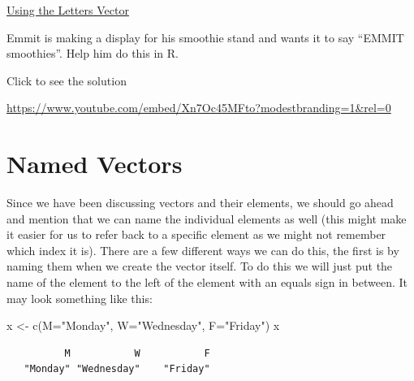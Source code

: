 \documentclass[
  letterpaper,
  DIV=11,
  numbers=noendperiod]{scrreprt}
\newenvironment{Shaded}{\begin{snugshade}}{\end{snugshade}}
\newcommand{\AttributeTok}[1]{\textcolor[rgb]{0.40,0.45,0.13}{#1}}
\newcommand{\FunctionTok}[1]{\textcolor[rgb]{0.28,0.35,0.67}{#1}}
\newcommand{\NormalTok}[1]{\textcolor[rgb]{0.00,0.23,0.31}{#1}}
\newcommand{\OtherTok}[1]{\textcolor[rgb]{0.00,0.23,0.31}{#1}}
\newcommand{\StringTok}[1]{\textcolor[rgb]{0.13,0.47,0.30}{#1}}
\begin{document}
\begin{watch}{}{}
    \href{https://youtu.be/H-q_LZVM0_0}{Using the Letters Vector}
\end{watch}

\begin{tcolorbox}[enhanced jigsaw, leftrule=.75mm, arc=.35mm, coltitle=black, rightrule=.15mm, bottomrule=.15mm, toprule=.15mm, left=2mm, colbacktitle=quarto-callout-tip-color!10!white, title=\textcolor{quarto-callout-tip-color}{\faLightbulb}\hspace{0.5em}{Try it Out}, toptitle=1mm, breakable, colframe=quarto-callout-tip-color-frame, bottomtitle=1mm, titlerule=0mm, colback=white, opacityback=0, opacitybacktitle=0.6]

Emmit is making a display for his smoothie stand and wants it to say
``EMMIT smoothies''. Help him do this in R.

Click to see the solution

\url{https://www.youtube.com/embed/Xn7Oc45MFto?modestbranding=1&rel=0}

\end{tcolorbox}

\section{Named Vectors}\label{named-vectors}

Since we have been discussing vectors and their elements, we should go
ahead and mention that we can name the individual elements as well (this
might make it easier for us to refer back to a specific element as we
might not remember which index it is). There are a few different ways we
can do this, the first is by naming them when we create the vector
itself. To do this we will just put the name of the element to the left
of the element with an equals sign in between. It may look something
like this:

\begin{Shaded}
\begin{Highlighting}[]
\NormalTok{x }\OtherTok{\textless{}{-}} \FunctionTok{c}\NormalTok{(}\AttributeTok{M=}\StringTok{"Monday"}\NormalTok{, }\AttributeTok{W=}\StringTok{"Wednesday"}\NormalTok{, }\AttributeTok{F=}\StringTok{"Friday"}\NormalTok{)}
\NormalTok{x}
\end{Highlighting}
\end{Shaded}

\begin{verbatim}
          M           W           F 
   "Monday" "Wednesday"    "Friday" 
\end{verbatim}
\end{document}
